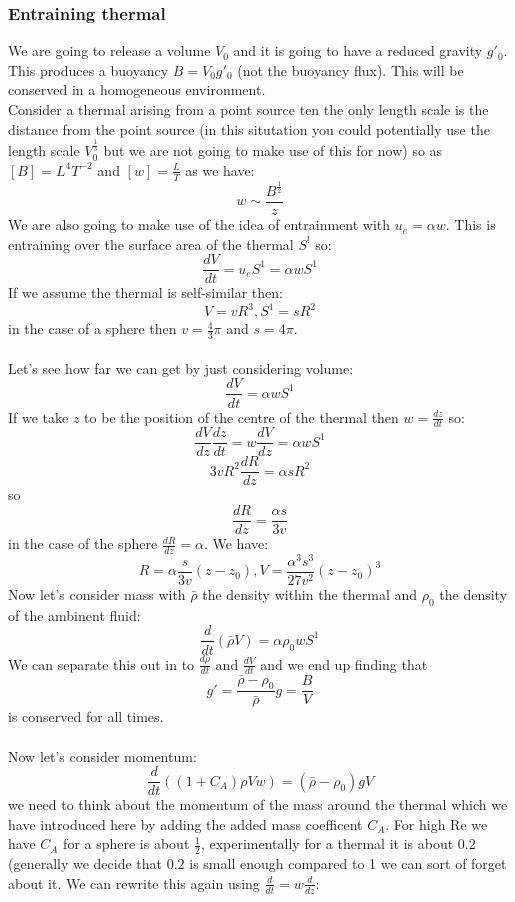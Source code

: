 \documentclass{article}
\begin{document}
                                 \subsubsection{Entraining thermal}
                                 We are going to release a volume $V_0$ and it is going to have a reduced gravity $g'_0$. This produces a buoyancy $B= V_0 g'_0$ (not the buoyancy flux). This will be conserved in a homogeneous environment. \\
                                 Consider a thermal arising from a point source ten the only length scale is the distance from the point source (in this situtation you could potentially use the length scale $V_0^{\frac{1}{3}}$ but we are not going to make use of this for now) so as $[B] = L^4 T^{-2}$ and $[w] = \frac{L}{T}$ as we have:
                                 $$
                                  w \sim \frac{B^{\frac{1}{2}}}{z}
                                 $$
We are also going to make use of the idea of entrainment with $u_e = \alpha w$. This is entraining over the surface area of the thermal $S^!$ so:
$$
 \frac{d V}{dt} = u_e S^1 = \alpha w S^1
$$
If we assume the thermal is self-similar then:
$$
 V = v R^3, S^1 = s R^2
$$
in the case of a sphere then $v = \frac{4}{3} \pi$ and $s = 4 \pi$.\\\\
Let's see how far we can get by just considering volume:
$$
 \frac{dV}{dt} = \alpha w S^1
$$
If we take $z$ to be the position of the centre of the thermal then $w = \frac{dz}{dt}$ so:
$$
 \frac{dV}{dz} \frac{dz}{dt} = w \frac{dV}{dz} = \alpha w S^1
$$
$$
 3 v R^2 \frac{dR}{dz} = \alpha s R^2
$$
so
$$
 \frac{dR}{dz} = \frac{\alpha s}{3 v}
$$
in the case of the sphere $\frac{dR}{dz} = \alpha$. We have:
$$
 R = \alpha \frac{s}{3v} (z-z_0), V = \frac{\alpha^3 s^3}{27 v^2} ( z- z_0)^3
$$
Now let's consider mass with $\bar \rho$ the density within the thermal and $\rho_0$ the density of the ambinent fluid:
$$
 \frac{d}{dt} ( \bar \rho V) = \alpha \rho_0 w S^1
$$
We can separate this out in to $\frac{d\bar \rho}{dt}$ and $\frac{d V}{dt}$ and we end up finding that
$$
 g' = \frac{\bar \rho - \rho_0}{\bar \rho} g = \frac{B}{V}
$$
is conserved for all times.\\\\
Now let's consider momentum:
$$
 \frac{d}{dt} ( ( 1+ C_A) \rho V w) = ( \bar \rho - \rho_0) g V
$$
we need to think about the momentum of the mass around the thermal which we have introduced here by adding the added mass coefficent $C_A$. For high Re we have $C_A$ for a sphere is about $\frac{1}{2}$, experimentally for a thermal it is about $0.2$ (generally we decide that $0.2$ is small enough compared to 1 we can sort of forget about it. We can rewrite this again using $\frac{d}{dt} = w \frac{d}{dz}$:
\end{document}
